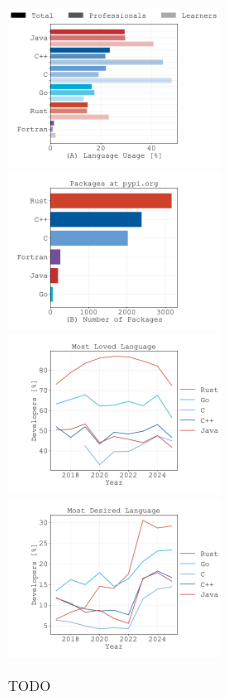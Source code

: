 \documentclass{article}
\begin{document}
\begin{figure}
    \centering
    \includegraphics[width=0.5\textwidth]{figures/stackoverflow-popular-languages.pdf}%
    \includegraphics[width=0.5\textwidth]{figures/pypi-org-used-languages.pdf}
    \includegraphics[width=0.5\textwidth]{figures/stackoverflow-loved-language.pdf}%
    \includegraphics[width=0.5\textwidth]{figures/stackoverflow-desired-language.pdf}
    \caption{TODO}
\end{figure}

\end{document}
